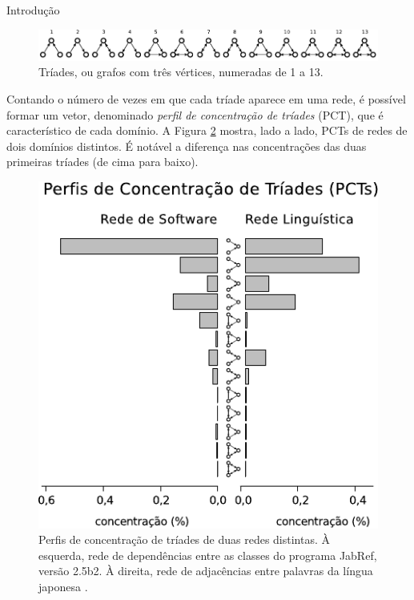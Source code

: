 \begin{section}{Introdução}
\begin{figure}[htbp]
	\centering
		\includegraphics[scale=1]{figuras/triads}
	\caption{Tríades, ou grafos com três vértices, numeradas de 1 a 13.}
	\label{fig:triades}
\end{figure}

Contando o número de vezes em que cada tríade aparece em uma rede, é possível formar um vetor, denominado \emph{perfil de concentração de tríades} (PCT), que é característico de cada domínio. A Figura \ref{fig:tcp} mostra, lado a lado, PCTs de redes de dois domínios distintos. É notável a diferença nas concentrações das duas primeiras tríades (de cima para baixo).

\begin{figure}[htbp]
	\centering
		\includegraphics[scale=1]{figuras/tcp}
	\caption{Perfis de concentração de tríades de duas redes distintas. À esquerda, rede de dependências entre as classes do programa JabRef, versão 2.5b2. À direita, rede de adjacências entre palavras da língua japonesa \cite{Milo2004}.}
	\label{fig:tcp}
\end{figure}

\end{section}

